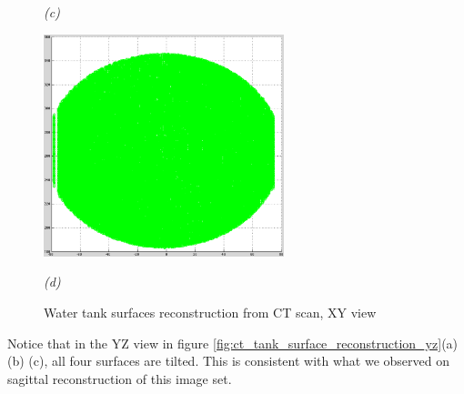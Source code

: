 \begin{figure}[htb]
\begin{minipage}[b]{2.75in}
    \centerline{\emph{(c)}}
  \end{minipage}\medskip
  \begin{minipage}[b]{2.75in}
    \centering
    \centerline{\mbox{\includegraphics[width=2.75in]{data_extraction/images/surface_plane/inferior_outside/xy.eps}}}
    \centerline{\emph{(d)}}
  \end{minipage}
  \caption{Water tank surfaces reconstruction from CT scan, XY view}
  \label{fig:ct_tank_surface_reconstruction_xy}
\end{figure}

Notice that in the YZ view in figure \ref{fig:ct_tank_surface_reconstruction_yz}(a) (b) (c), 
all four surfaces are tilted. This is consistent with what we observed on sagittal reconstruction 
of this image set. 

